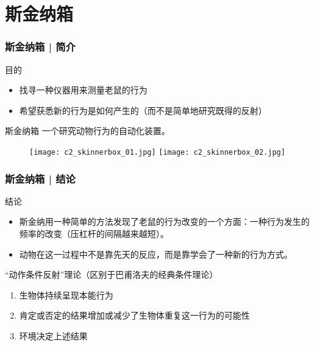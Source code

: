 \section{斯金纳箱}
\begin{frame}
  \frametitle{斯金纳箱 | 简介}
  \begin{block}{目的}
    \begin{itemize}
      \item 找寻一种仪器用来测量老鼠的行为
      \item 希望获悉新的行为是如何产生的（而不是简单地研究既得的反射）
    \end{itemize}
  \end{block}
  \pause
  \begin{block}{斯金纳箱}
    一个研究动物行为的自动化装置。
    \vspace{-0.8em}
  \begin{figure}
    \centering
    \texttt{[image: c2\_skinnerbox\_01.jpg]}\quad
    \texttt{[image: c2\_skinnerbox\_02.jpg]}
  \end{figure}
  \end{block}
\end{frame}

\begin{frame}
  \frametitle{斯金纳箱 | 结论}
  \begin{block}{结论}
    \begin{itemize}
      \item 斯金纳用一种简单的方法发现了老鼠的行为改变的一个方面：一种行为发生的频率的改变（压杠杆的间隔越来越短）。
      \item 动物在这一过程中不是靠先天的反应，而是靠学会了一种新的行为方式。
    \end{itemize}
  \end{block}
  \pause
  \begin{block}{“动作条件反射”理论（区别于巴甫洛夫的经典条件理论）}
    \begin{enumerate}
      \item 生物体持续呈现本能行为
      \item 肯定或否定的结果增加或减少了生物体重复这一行为的可能性
      \item 环境决定上述结果
    \end{enumerate}
  \end{block}
\end{frame}

